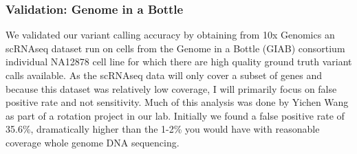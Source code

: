 \subsubsection{Validation: Genome in a Bottle}
\par{
We validated our variant calling accuracy by obtaining from 10x Genomics an scRNAseq dataset run on cells from the Genome in a Bottle (GIAB) consortium individual NA12878 cell line for which there are high quality ground truth variant calls available\cite{giab}. As the scRNAseq data will only cover a subset of genes and because this dataset was relatively low coverage, I will primarily focus on false positive rate and not sensitivity. Much of this analysis was done by Yichen Wang as part of a rotation project in our lab. Initially we found a false positive rate of 35.6\%, dramatically higher than the 1-2\% you would have with reasonable coverage whole genome DNA sequencing.
}


